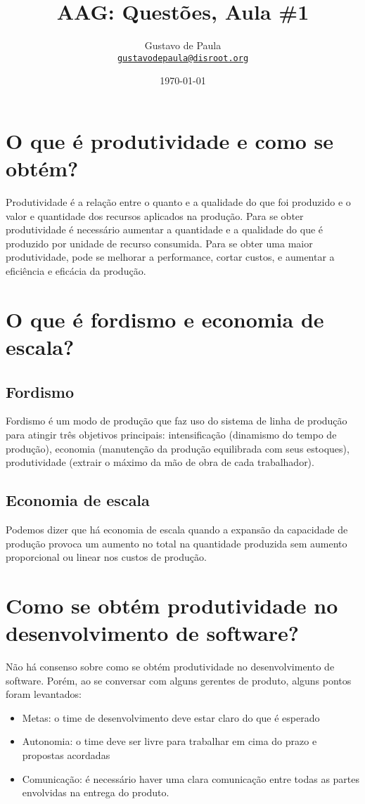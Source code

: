 \documentclass[11pt]{article}
\author{Gustavo de Paula\\ \texttt{\href{mailto:gustavodepaula@disroot.org}{gustavodepaula@disroot.org}}}
\date{\today}
\title{AAG: Questões, Aula \#1}
\begin{document}
\maketitle
\tableofcontents


\section{O que é produtividade e como se obtém?}
\label{sec:orgcaa9285}
Produtividade é a relação entre o quanto e a qualidade do que foi produzido e o
valor e quantidade dos recursos aplicados na produção.
Para se obter produtividade é necessário aumentar a quantidade e a qualidade do
que é produzido por unidade de recurso consumida.
Para se obter uma maior produtividade, pode se melhorar a performance, cortar
custos, e aumentar a eficiência e eficácia da produção.

\section{O que é fordismo e economia de escala?}
\label{sec:org7ce1724}
\subsection{Fordismo}
\label{sec:org05f3ef6}
Fordismo é um modo de produção que faz uso do sistema de linha de produção para
atingir três objetivos principais: intensificação (dinamismo do tempo de
produção), economia (manutenção da produção equilibrada com seus estoques),
produtividade (extrair o máximo da mão de obra de cada trabalhador).

\subsection{Economia de escala}
\label{sec:orgabc5e17}
Podemos dizer que há economia de escala quando a expansão da capacidade de
produção provoca um aumento no total na quantidade produzida sem aumento
proporcional ou linear nos custos de produção.

\section{Como se obtém produtividade no desenvolvimento de software?}
\label{sec:org3d3fd8b}
Não há consenso sobre como se obtém produtividade no desenvolvimento de
software. Porém, ao se conversar com alguns gerentes de produto, alguns pontos
foram levantados:
\begin{itemize}
\item Metas: o time de desenvolvimento deve estar claro do que é esperado
\item Autonomia: o time deve ser livre para trabalhar em cima do prazo e propostas
acordadas
\item Comunicação: é necessário haver uma clara comunicação entre todas as partes
envolvidas na entrega do produto.
\end{itemize}
\end{document}
